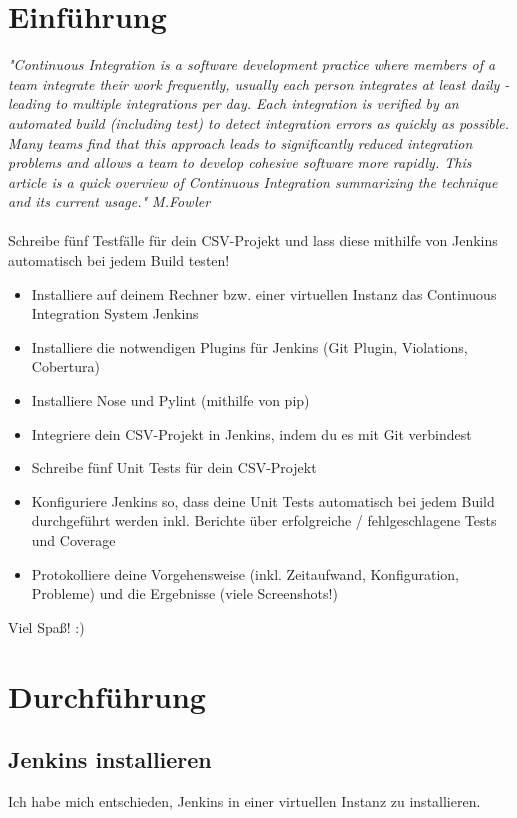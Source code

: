 \documentclass[letterpaper, 12pt]{article}
\let\tempsection\section
\renewcommand\section[1]{\vspace{-0.3cm}\tempsection{#1}\vspace{-0.3cm}}
\let\tempsubsection\subsection
\renewcommand\subsection[1]{\vspace{0cm}\tempsubsection{#1}\vspace{0cm}}
\begin{document}
\parindent 0pt
\parskip 6pt



\clearpage
\thispagestyle{empty}
\tableofcontents

\newpage
{}
\pagestyle{fancy}

\section{Einführung}
\textit{"Continuous Integration is a software development practice where members of a team integrate their work frequently, usually each person integrates at least daily - leading to multiple integrations per day. Each integration is verified by an automated build (including test) to detect integration errors as quickly as possible. Many teams find that this approach leads to significantly reduced integration problems and allows a team to develop cohesive software more rapidly. This article is a quick overview of Continuous Integration summarizing the technique and its current usage." M.Fowler} \\ \\

Schreibe fünf Testfälle für dein CSV-Projekt und lass diese mithilfe von Jenkins automatisch bei jedem Build testen!

\begin{itemize}
	\item Installiere auf deinem Rechner bzw. einer virtuellen Instanz das Continuous Integration System Jenkins
	\item Installiere die notwendigen Plugins für Jenkins (Git Plugin, Violations, Cobertura)
	\item Installiere Nose und Pylint (mithilfe von pip)
	\item Integriere dein CSV-Projekt in Jenkins, indem du es mit Git verbindest
	\item Schreibe fünf Unit Tests für dein CSV-Projekt
	\item Konfiguriere Jenkins so, dass deine Unit Tests automatisch bei jedem Build durchgeführt werden inkl. Berichte über erfolgreiche / fehlgeschlagene Tests und Coverage
	\item Protokolliere deine Vorgehensweise (inkl. Zeitaufwand, Konfiguration, Probleme) und die Ergebnisse (viele Screenshots!)
\end{itemize}

Viel Spaß! :)
\newpage

\section{Durchführung}

\subsection{Jenkins installieren}
Ich habe mich entschieden, Jenkins in einer virtuellen Instanz zu installieren.

\clearpage



\lstlistoflistings
\listoffigures
\end{document}

